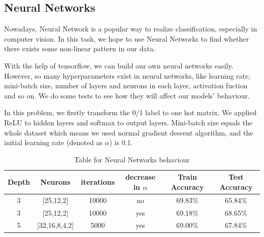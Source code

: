 \documentclass[a4paper,11pt,onecolumn,twoside]{article}
\begin{document}
\subsection{Neural Networks}
Nowadays, Neural Network is a popular way to realize classification, especially in computer vision. In this task, we hope to use Neural Networks to find whether there exists some non-linear pattern in our data. \par 
With the help of tensorflow, we can build our own neural networks easily. However, so many hyperparameters exist in neural networks, like learning rate, mini-batch size, number of layers and neurons in each layer, activation fuction and so on. We do some tests to see how they will affect our models' behaviour.\par
In this problem, we firstly transform the 0/1 label to one hot matrix. We applied ReLU to hidden layers and softmax to output layers. Mini-batch size equals the whole dataset which means we used normal gradient descent algorithm, and the initial learning rate (denoted as $\alpha$) is 0.1.
\begin{table}[H]
	\centering
	\begin{tabular}{cccccc}
		\midrule[1.5pt]
		\textbf{Depth} &\textbf{Neurons}&\textbf{iterations}  &\textbf{decrease in $\alpha$}&\textbf{Train Accuracy}&\textbf{Test Accuracy}\\
		\hline
		3&[25,12,2]&10000&no&69.83\%&65.84\%\\
		3&[25,12,2]&10000&yes&69.18\%&68.65\%\\
		5&[32,16,8,4,2]&5000&yes&69.00\%&67.84\%\\
		\midrule[1.5pt]
	\end{tabular}
	\caption{Table for Neural Networks behaviour}
\end{table}
\end{document}
